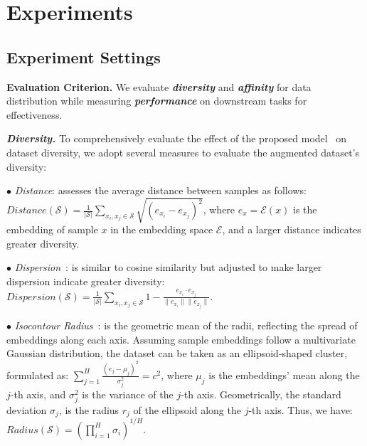 
\vspace{-3mm}
\section{Experiments}

\vspace{-0.2cm}
\subsection{Experiment Settings}

\noindent\textbf{Evaluation Criterion.} 
We evaluate \textit{\textbf{diversity}} and \textit{\textbf{affinity}} for data distribution while measuring \textit{\textbf{performance}} on downstream tasks for effectiveness. 

\noindent \textit{\textbf{Diversity.}}
To comprehensively evaluate the effect of the proposed model \Methodname~on dataset diversity, we adopt several measures to evaluate  the augmented dataset's diversity: 

$\bullet$ \textit{Distance}: assesses the average distance between samples as follows:
    \({Distance(\mathcal{S}) = \frac{1}{|\mathcal{S}|} \sum_{x_i, x_j \in \mathcal{S}} \sqrt{(e_{x_i} - e_{x_j})^2}}\), 
    where \(e_x = \mathcal{E}(x)\) is the embedding of sample \(x\) in the embedding space \(\mathcal{E}\), and a larger distance indicates greater diversity.  

$\bullet$ \textit{Dispersion}~\cite{yu2022can}: is similar to cosine similarity but adjusted to make larger dispersion indicate greater diversity: 
        \(\mathit{Dispersion}(\mathcal{S}) = \frac{1}{|\mathcal{S}|} \sum_{x_i, x_j \in \mathcal{S}} 1 - \frac{e_{x_i} \cdot e_{x_j}}{\|e_{x_i}\|\|e_{x_j}\|}\). 

$\bullet$ \textit{Isocontour Radius}~\cite{lai2020diversity}: 
is the geometric mean of the radii, reflecting the spread of embeddings along each axis. 
    Assuming sample embeddings follow a multivariate Gaussian distribution, the dataset can be taken as an ellipsoid-shaped cluster, formulated as: \(\sum_{j=1}^{H} \frac{(e_j - \mu_j)^2}{\sigma_j^2} = c^2\),
    where \(\mu_j\) is the embeddings' mean along the \(j\)-th axis, and \(\sigma_j^2\) is the variance of the \(j\)-th axis. 
    Geometrically, the standard deviation \(\sigma_j\), is the radius \(r_j\) of the ellipsoid along the \(j\)-th axis. Thus, we have: 
        \(\mathit{Radius}(\mathcal{S}) = (\prod_{i=1}^{H} \sigma_i)^{1/H}\). 

